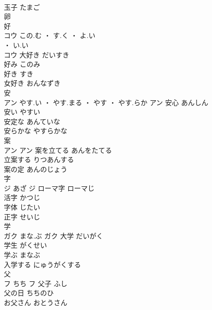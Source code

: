 \documentclass[8pt]{extreport}
\begin{document}
\begin{CJK}{UTF8}{min}
\\	玉子	たまご	
\\	卵 
\\	好	
\\	コウ	この.む ・ す.く ・ よ.い
\\	・ い.い
\\	コウ	大好き	だいすき	
\\	好み	このみ	
\\	好き	すき	
\\	女好き	おんなずき	
\\	安	
\\	アン	やす.い ・ やす.まる ・ やす ・ やす.らか	アン	安心	あんしん	
\\	安い	やすい	
\\	安定な	あんていな	
\\	安らかな	やすらかな	
\\	案	
\\	アン		アン	案を立てる	あんをたてる	
\\	立案する	りつあんする	
\\	案の定	あんのじょう	
\\	字	
\\	ジ	あざ	ジ	ローマ字	ローマじ	
\\	活字	かつじ	
\\	字体	じたい	
\\	正字	せいじ	
\\	学	
\\	ガク	まな.ぶ	ガク	大学	だいがく	
\\	学生	がくせい	
\\	学ぶ	まなぶ	
\\	入学する	にゅうがくする	
\\	父	
\\	フ	ちち	フ	父子	ふし	
\\	父の日	ちちのひ	
\\	お父さん	おとうさん	
\end{CJK}
\end{document}
